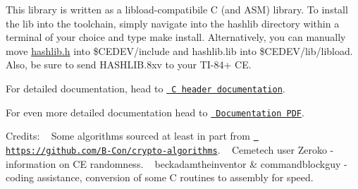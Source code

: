 This library is written as a libload-\/compatibile C (and ASM) library. To install the lib into the toolchain, simply navigate into the hashlib directory within a terminal of your choice and type {\ttfamily make install}. Alternatively, you can manually move {\ttfamily \mbox{\hyperlink{hashlib_8h}{hashlib.\+h}}} into {\ttfamily \$\+CEDEV/include} and {\ttfamily hashlib.\+lib} into {\ttfamily \$\+CEDEV/lib/libload}. Also, be sure to send {\ttfamily HASHLIB.\+8xv} to your TI-\/84+ CE.

For detailed documentation, head to \href{https://acagliano.github.io/hashlib/html/hashlib_8h.html}{\texttt{ C header documentation}}.

For even more detailed documentation head to \href{https://github.com/acagliano/hashlib/blob/stable/Hashlib\%20Documentation.pdf}{\texttt{ Documentation PDF}}.

Credits\+: ~\newline
 Some algorithms sourced at least in part from \href{https://github.com/B-Con/crypto-algorithms}{\texttt{ https\+://github.\+com/\+B-\/\+Con/crypto-\/algorithms}}. ~\newline
 Cemetech user Zeroko -\/ information on CE randomness. ~\newline
 beckadamtheinventor \& commandblockguy -\/ coding assistance, conversion of some C routines to assembly for speed. ~\newline
 